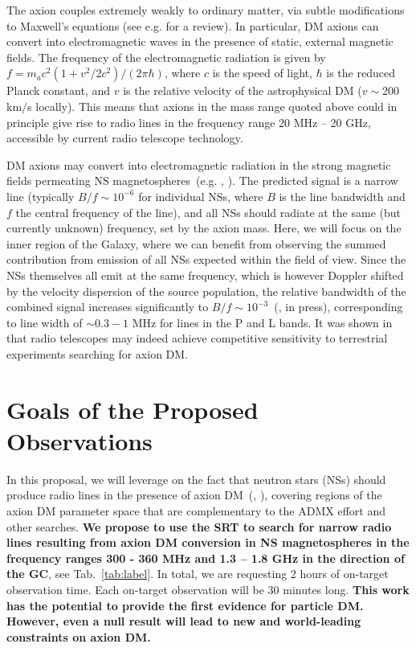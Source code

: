 \documentclass[a4paper, 11pt]{article}
\begin{document}
The axion couples extremely weakly to ordinary matter, via  subtle modifications to Maxwell's equations (see e.g. \cite{Graham:2015ouw} for a review).  In particular, DM axions can convert into electromagnetic waves in the presence of static, external magnetic fields.  The frequency of the electromagnetic radiation is given by $f = m_a c^2 (1 + v^2 / 2 c^2) / (2 \pi \hbar)$, where $c$ is the speed of light, $\hbar$ is the reduced Planck constant, and $v$ is the relative velocity of the astrophysical DM ($v \sim 200$ km$/$s locally).  This means that axions in the mass range quoted above could in principle give rise to radio lines in the frequency range 20 MHz -- 20 GHz, accessible by current radio telescope technology.

DM axions may convert into electromagnetic radiation in the strong magnetic fields permeating NS magnetospheres~(e.g. \cite{Pshirkov:2007st}, \cite{Hook:2018iia}).  The predicted signal is a narrow line (typically $B / f \sim 10^{-6}$ for individual NSs, where $B$ is the line bandwidth and $f$ the central frequency of the line), and all NSs should radiate at the same (but currently unknown) frequency, set by the axion mass.   Here, we will focus on the inner region of the Galaxy, where we can benefit from observing the summed contribution from emission of all NSs expected within the field of view.  Since the NSs themselves all emit at the same frequency, which is however Doppler shifted by the velocity dispersion of the source population, the relative bandwidth of the combined signal increases significantly to $B /f \sim 10^{-3}$~(\cite{SafdiToAppear}, in press), corresponding to line width of $\sim 0.3-1$ MHz for lines in the P and L bands. It was shown in \cite{Hook:2018iia} that radio telescopes may indeed achieve competitive sensitivity to terrestrial experiments searching for axion DM.


\section*{Goals of the Proposed Observations}

In this proposal, we will leverage on the fact that neutron stars (NSs) should produce radio lines in the presence of axion DM~(\cite{Pshirkov:2007st}, \cite{Hook:2018iia}), covering regions of the axion DM parameter space that are complementary to the ADMX effort and other searches.   \textbf{We propose to use the SRT to search for narrow radio lines resulting from axion DM conversion in NS magnetospheres in the frequency ranges 300 - 360 MHz and 1.3 -- 1.8 GHz in the direction of the GC}, see Tab.~\ref{tab:label}.  In total, we are requesting 2 hours of on-target observation time.  Each on-target observation will be 30 minutes long.   \textbf{This work has the potential to provide the first evidence for particle DM.  However, even a null result will lead to new and world-leading constraints on axion DM.} 
\end{document}
